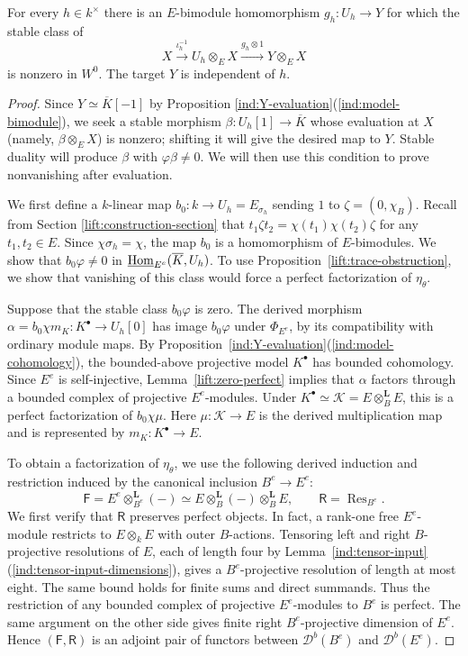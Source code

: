 \documentclass[11pt]{article}
\begin{document}
\begin{Prop}\label{lift:nonzero-lifts}
For every $h\in k^\times$ there is an $E$-bimodule homomorphism
$g_h:U_h\to Y$ for which the stable class of
\[
 X\xrightarrow{\iota_h^{-1}}U_h\otimes_E X
   \xrightarrow{g_h\otimes1}Y\otimes_E X
\]
is nonzero in $W^0$. The target $Y$ is independent of $h$.
\end{Prop}

\begin{proof}
Since $Y\simeq\overline K[-1]$ by Proposition \ref{ind:Y-evaluation}\textup{(\ref{ind:model-bimodule})}, we seek a stable morphism
$\beta:U_h[1]\to\overline K$ whose evaluation at $X$ (namely, $\beta\otimes_EX$) is nonzero; shifting it will give the desired map to $Y$. Stable duality will produce $\beta$ with $\varphi\beta\ne0$. We will then use this condition to prove nonvanishing after evaluation.


We first define a $k$-linear map $b_0:k\to U_h=E_{\sigma_h}$ sending $1$ to $\zeta=(0, \chi_B)$. Recall from Section \ref{lift:construction-section} that $t_1\zeta t_2=\chi(t_1)\chi(t_2)\zeta$ for any $t_1, t_2\in E$. Since $\chi\sigma_h=\chi$, the map $b_0$ is a homomorphism of $E$-bimodules.
We show that $b_0\varphi\ne0$ in $\underline{{\rm Hom}}_{E^e}(\overline K,U_h)$.
To use Proposition~\ref{lift:trace-obstruction}, we show that vanishing of this class would force a perfect factorization of $\eta_\theta$.

Suppose that the stable class $b_0\varphi$ is zero. The derived morphism
$\alpha=b_0\chi m_K:K^\bullet\to U_h[0]$ has image $b_0\varphi$ under $\Phi_{E^e}$, by its compatibility with ordinary module maps. By Proposition~\ref{ind:Y-evaluation}\textup{(\ref{ind:model-cohomology})}, the bounded-above projective model $K^\bullet$ has bounded cohomology. Since $E^e$ is self-injective, Lemma~\ref{lift:zero-perfect} implies that $\alpha$ factors through a bounded complex of projective $E^e$-modules.
Under $K^\bullet\simeq\mathcal K=E\otimes_B^{\mathbf L}E$, this is a perfect factorization of
$b_0\chi\mu$. Here $\mu:\mathcal K\to E$ is the derived multiplication map and is
represented by $m_K:K^\bullet\to E$.

To obtain a factorization of $\eta_\theta$, we use the following derived induction and restriction induced by the canonical inclusion $B^e\to E^e$:
\[
 \mathsf F=E^e\otimes_{B^e}^{\mathbf L}(-)
  \simeq E\otimes_B^{\mathbf L}(-)\otimes_B^{\mathbf L}E,
 \qquad
 \mathsf R=\operatorname{Res}_{B^e}.
\]
We first verify that $\mathsf R$ preserves perfect objects. In fact, a rank-one free $E^e$-module restricts to $E\otimes_kE$ with outer $B$-actions. Tensoring left and right $B$-projective resolutions of $E$, each of length four by Lemma~\ref{ind:tensor-input}\textup{(\ref{ind:tensor-input-dimensions})}, gives a $B^e$-projective resolution of length at most eight. The same bound holds for finite sums and direct summands. Thus the restriction of any bounded complex of projective $E^e$-modules to $B^e$ is perfect. The same argument on the other side gives finite right $B^e$-projective dimension of $E^e$. Hence $(\mathsf F, \mathsf R)$ is an adjoint pair of functors between $\mathscr D^b(B^e)$ and $\mathscr D^b(E^e)$.


\end{proof}
\end{document}
